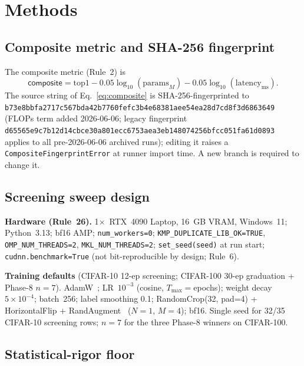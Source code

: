 \documentclass{article}
\begin{document}
\section{Methods}
\label{sec:methods}

\subsection{Composite metric and SHA-256 fingerprint}
\label{sec:composite}

The composite metric (Rule~2) is
\begin{equation}
\textsf{composite} = \mathrm{top1} - 0.05 \log_{10}(\mathrm{params}_M)
                                  - 0.05 \log_{10}(\mathrm{latency}_{\mathrm{ms}}).
\label{eq:composite}
\end{equation}
The source string of Eq.~\ref{eq:composite} is SHA-256-fingerprinted
to \texttt{b73e8bbfa2717c567bda42b7760fefc3b4e68381aee54ea28d7cd8f3d6863649}
(FLOPs term added 2026-06-06; legacy fingerprint
\texttt{d65565e9c7b12d14cbce30a801ecc6753aea3eb148074256bfcc051fa61d0893}
applies to all pre-2026-06-06 archived runs);
editing it raises a \texttt{CompositeFingerprintError} at runner
import time. A new branch is required to change it.

\subsection{Screening sweep design}
\label{sec:screening}

\textbf{Hardware (Rule~26).} 1$\times$~RTX~4090 Laptop, 16~GB VRAM,
Windows~11; Python~3.13; bf16 AMP; \texttt{num\_workers=0};
\texttt{KMP\_DUPLICATE\_LIB\_OK=TRUE},
\texttt{OMP\_NUM\_THREADS=2}, \texttt{MKL\_NUM\_THREADS=2};
\texttt{set\_seed(seed)} at run start; \texttt{cudnn.benchmark=True}
(not bit-reproducible by design; Rule~6).

\textbf{Training defaults} (CIFAR-10 12-ep screening; CIFAR-100 30-ep
graduation + Phase-8 $n{=}7$). AdamW~\citep{loshchilov2019adamw};
LR~$10^{-3}$ (cosine, $T_{\max}{=}$epochs); weight decay $5{\times}10^{-4}$;
batch~256; label smoothing 0.1; RandomCrop(32, pad=4) + HorizontalFlip
+ RandAugment~\citep{cubuk2020randaugment} ($N{=}1$, $M{=}4$); bf16.
Single seed for 32/35 CIFAR-10 screening rows; $n{=}7$ for the three
Phase-8 winners on CIFAR-100.

\subsection{Statistical-rigor floor}
\label{sec:stats-floor}
\end{document}
